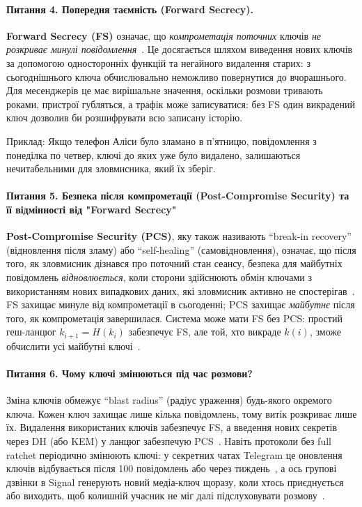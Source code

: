 \paragraph{Питання 4. Попередня таємність (Forward Secrecy).}
\textbf{Forward Secrecy (FS)} означає, що \textit{компрометація поточних} ключів \emph{не розкриває минулі повідомлення}~\cite{signal_double_ratchet}. 
Це досягається шляхом виведення нових ключів за допомогою односторонніх функцій та негайного видалення старих: з 
сьогоднішнього ключа обчислювально неможливо повернутися до вчорашнього. Для месенджерів це має вирішальне значення, 
оскільки розмови тривають роками, пристрої губляться, а трафік може записуватися: без FS один викрадений ключ дозволив 
би розшифрувати всю записану історію.

Приклад: Якщо телефон Аліси було зламано в п’ятницю, повідомлення з понеділка по четвер, ключі до яких уже було 
видалено, залишаються нечитабельними для зловмисника, який їх зберіг.

\paragraph{Питання 5. Безпека після компрометації (Post-Compromise Security) та її відмінності від "Forward Secrecy"{}}
\textbf{Post-Compromise Security (PCS)}, яку також називають \enquote{break-in recovery} (відновлення після зламу) 
або \enquote{self-healing} (самовідновлення), означає, що після того, як зловмисник дізнався про поточний стан сеансу, 
безпека для майбутніх повідомлень \emph{відновлюється}, коли сторони здійснюють обмін ключами з використанням нових 
випадкових даних, які зловмисник активно не спостерігав~\cite{cohngordon2016pcs, signal_double_ratchet}. FS захищає 
минуле від компрометації в сьогоденні; PCS захищає \emph{майбутнє} після того, як компрометація завершилася. Система 
може мати FS без PCS: простий геш-ланцюг $k_{i+1} = H(k_i)$ забезпечує FS, але той, хто викраде $k(i)$, зможе 
обчислити усі майбутні ключі~\cite{signal_double_ratchet}.

\paragraph{Питання 6. Чому ключі змінюються під час розмови?}
Зміна ключів обмежує \enquote{blast radius} (радіус ураження) будь-якого окремого ключа. Кожен ключ захищає лише 
кілька повідомлень, тому витік розкриває лише їх. Видалення використаних ключів забезпечує FS, а введення нових 
секретів через DH (або KEM) у ланцюг забезпечую PCS~\cite{signal_double_ratchet}.
Навіть протоколи без full ratchet періодично змінюють ключі: у секретних чатах Telegram це оновлення ключів 
відбувається після 100 повідомлень або через тиждень~\cite{telegram_e2e}, а ось групові дзвінки в Signal генерують 
новий медіа-ключ щоразу, коли хтось приєднується або виходить, щоб колишній учасник не міг далі підслуховувати 
розмову~\cite{signal_group_calls}.

